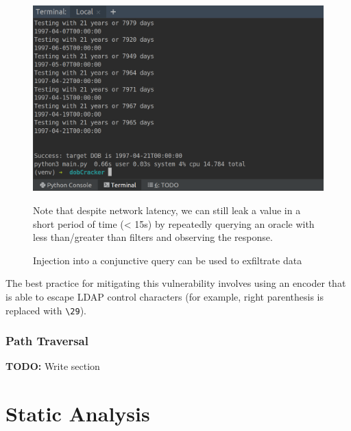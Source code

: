\documentclass[a4paper,openany,12pt]{book}
\newcommand{\todobox}[1] {\colorbox{todocolor}{\parbox{\dimexpr \linewidth-\columnsep}{\vspace{.75\baselineskip}\centering\parbox{0.95\linewidth}{\faIcon{lightbulb} \textbf{TODO:} #1\vspace{.75\baselineskip}}}}}
\begin{document}
\begin{figure}[H]
    \begin{MyMdframed}
        \vspace{0.5em}


        \caption{Injection into a conjunctive query can be used to exfiltrate data}
        \vspace{0.5em}
        \captionsetup{style=default}

        \begin{center}\includegraphics[width=0.5\linewidth]{dobcrack.png}\end{center}

        \vspace{0.5em}

        Note that despite network latency, we can still leak a value in a short period of time (< 15s) by
        repeatedly querying an oracle with less than/greater than filters and observing the response.
    \end{MyMdframed}
\end{figure}

The best practice for mitigating this vulnerability involves using an encoder that is able to escape LDAP control
characters (for example, right parenthesis is replaced with \texttt{\textbackslash 29}).


\subsubsection{Path Traversal}



\todobox{Write section}

\section{Static Analysis}
\end{document}
